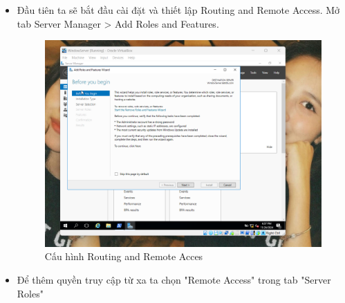  \begin{itemize}
      \item Đầu tiên ta sẽ bắt đầu cài đặt và thiết lập Routing and Remote Access. Mở tab Server Manager > Add Roles and Features.
      \begin{figure}[htbp]
        \centering
        \includegraphics[width=0.6\linewidth]{RemoteAccessVPNimg/1.png}
        \caption{Cấu hình Routing and Remote Acces}
    \end{figure}
    \newpage
\item Để thêm quyền truy cập từ xa ta chọn "Remote Access" trong tab "Server Roles"


\end{itemize}
